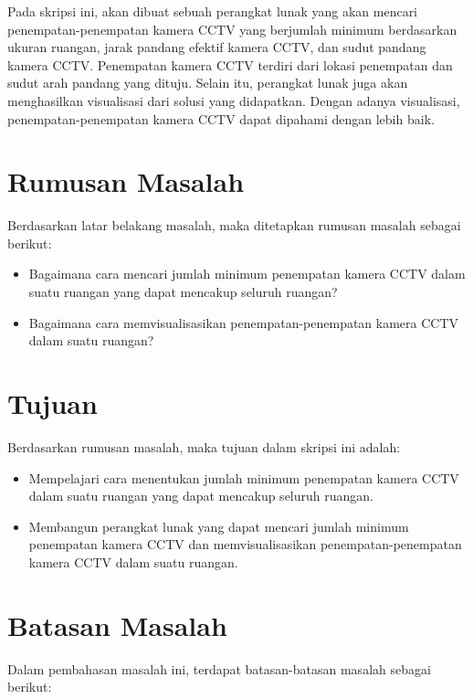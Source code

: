 Pada skripsi ini, akan dibuat sebuah perangkat lunak yang akan mencari penempatan-penempatan kamera CCTV yang berjumlah minimum berdasarkan ukuran ruangan, jarak pandang efektif kamera CCTV, dan sudut pandang kamera CCTV. Penempatan kamera CCTV terdiri dari lokasi penempatan dan sudut arah pandang yang dituju. Selain itu, perangkat lunak juga akan menghasilkan visualisasi dari solusi yang didapatkan. Dengan adanya visualisasi, penempatan-penempatan kamera CCTV dapat dipahami dengan lebih baik.

\section{Rumusan Masalah}
\label{sec:rumusan}

Berdasarkan latar belakang masalah, maka ditetapkan rumusan masalah sebagai berikut:

\begin{itemize}
	\item Bagaimana cara mencari jumlah minimum penempatan kamera CCTV dalam suatu ruangan yang dapat mencakup seluruh ruangan?
	\item Bagaimana cara memvisualisasikan penempatan-penempatan kamera CCTV dalam suatu ruangan?
\end{itemize}

\section{Tujuan}
\label{sec:tujuan}

Berdasarkan rumusan masalah, maka tujuan dalam skripsi ini adalah:

\begin{itemize}
	\item Mempelajari cara menentukan jumlah minimum penempatan kamera CCTV dalam suatu ruangan yang dapat mencakup seluruh ruangan.
	\item Membangun perangkat lunak yang dapat mencari jumlah minimum penempatan kamera CCTV dan memvisualisasikan penempatan-penempatan kamera CCTV dalam suatu ruangan.
\end{itemize}

\section{Batasan Masalah}
\label{sec:batasan}

Dalam pembahasan masalah ini, terdapat batasan-batasan masalah sebagai berikut:

